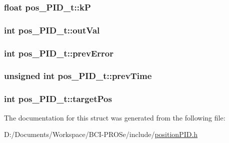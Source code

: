 \subsubsection[{\texorpdfstring{kP}{kP}}]{\setlength{\rightskip}{0pt plus 5cm}float pos\+\_\+\+P\+I\+D\+\_\+t\+::kP}\hypertarget{structpos___p_i_d__t_acb8e4e1f24cb049d09a3fe284a85ae0a}{}\label{structpos___p_i_d__t_acb8e4e1f24cb049d09a3fe284a85ae0a}
\subsubsection[{\texorpdfstring{out\+Val}{outVal}}]{\setlength{\rightskip}{0pt plus 5cm}int pos\+\_\+\+P\+I\+D\+\_\+t\+::out\+Val}\hypertarget{structpos___p_i_d__t_aa62fcab2d7795f7be45683d223ca1bc9}{}\label{structpos___p_i_d__t_aa62fcab2d7795f7be45683d223ca1bc9}
\subsubsection[{\texorpdfstring{prev\+Error}{prevError}}]{\setlength{\rightskip}{0pt plus 5cm}int pos\+\_\+\+P\+I\+D\+\_\+t\+::prev\+Error}\hypertarget{structpos___p_i_d__t_a0c962ac481b0e7486e167acde79b3c31}{}\label{structpos___p_i_d__t_a0c962ac481b0e7486e167acde79b3c31}
\subsubsection[{\texorpdfstring{prev\+Time}{prevTime}}]{\setlength{\rightskip}{0pt plus 5cm}unsigned int pos\+\_\+\+P\+I\+D\+\_\+t\+::prev\+Time}\hypertarget{structpos___p_i_d__t_ae9da36bee552934a96a52a63b939308e}{}\label{structpos___p_i_d__t_ae9da36bee552934a96a52a63b939308e}
\subsubsection[{\texorpdfstring{target\+Pos}{targetPos}}]{\setlength{\rightskip}{0pt plus 5cm}int pos\+\_\+\+P\+I\+D\+\_\+t\+::target\+Pos}\hypertarget{structpos___p_i_d__t_afd2e502d5fcacb47263db803ba6a92e3}{}\label{structpos___p_i_d__t_afd2e502d5fcacb47263db803ba6a92e3}


The documentation for this struct was generated from the following file\+:\begin{DoxyCompactItemize}
\item 
D\+:/\+Documents/\+Workspace/\+B\+C\+I-\/\+P\+R\+O\+Se/include/\hyperlink{position_p_i_d_8h}{position\+P\+I\+D.\+h}\end{DoxyCompactItemize}

